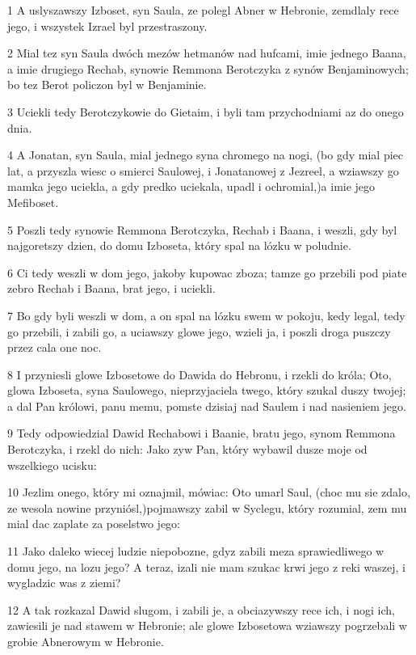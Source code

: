 \par 1 A uslyszawszy Izboset, syn Saula, ze polegl Abner w Hebronie, zemdlaly rece jego, i wszystek Izrael byl przestraszony.
\par 2 Mial tez syn Saula dwóch mezów hetmanów nad hufcami, imie jednego Baana, a imie drugiego Rechab, synowie Remmona Berotczyka z synów Benjaminowych; bo tez Berot policzon byl w Benjaminie.
\par 3 Uciekli tedy Berotczykowie do Gietaim, i byli tam przychodniami az do onego dnia.
\par 4 A Jonatan, syn Saula, mial jednego syna chromego na nogi, (bo gdy mial piec lat, a przyszla wiesc o smierci Saulowej, i Jonatanowej z Jezreel, a wziawszy go mamka jego uciekla, a gdy predko uciekala, upadl i ochromial,)a imie jego Mefiboset.
\par 5 Poszli tedy synowie Remmona Berotczyka, Rechab i Baana, i weszli, gdy byl najgoretszy dzien, do domu Izboseta, który spal na lózku w poludnie.
\par 6 Ci tedy weszli w dom jego, jakoby kupowac zboza; tamze go przebili pod piate zebro Rechab i Baana, brat jego, i uciekli.
\par 7 Bo gdy byli weszli w dom, a on spal na lózku swem w pokoju, kedy legal, tedy go przebili, i zabili go, a uciawszy glowe jego, wzieli ja, i poszli droga puszczy przez cala one noc.
\par 8 I przyniesli glowe Izbosetowe do Dawida do Hebronu, i rzekli do króla; Oto, glowa Izboseta, syna Saulowego, nieprzyjaciela twego, który szukal duszy twojej; a dal Pan królowi, panu memu, pomste dzisiaj nad Saulem i nad nasieniem jego.
\par 9 Tedy odpowiedzial Dawid Rechabowi i Baanie, bratu jego, synom Remmona Berotczyka, i rzekl do nich: Jako zyw Pan, który wybawil dusze moje od wszelkiego ucisku:
\par 10 Jezlim onego, który mi oznajmil, mówiac: Oto umarl Saul, (choc mu sie zdalo, ze wesola nowine przyniósl,)pojmawszy zabil w Syclegu, który rozumial, zem mu mial dac zaplate za poselstwo jego:
\par 11 Jako daleko wiecej ludzie niepobozne, gdyz zabili meza sprawiedliwego w domu jego, na lozu jego? A teraz, izali nie mam szukac krwi jego z reki waszej, i wygladzic was z ziemi?
\par 12 A tak rozkazal Dawid slugom, i zabili je, a obciazywszy rece ich, i nogi ich, zawiesili je nad stawem w Hebronie; ale glowe Izbosetowa wziawszy pogrzebali w grobie Abnerowym w Hebronie.

